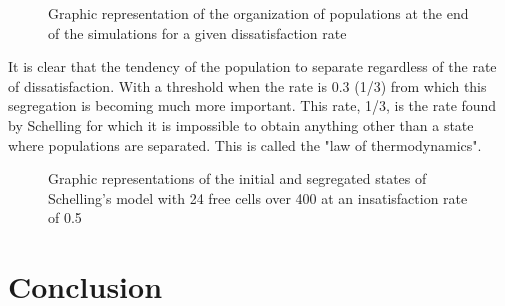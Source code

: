 \documentclass[a4paper, 12pt]{report}
\begin{document}
\begin{figure}[!h]
	\centering
	\caption{Graphic representation of the organization of populations at the end of the simulations for a given dissatisfaction rate}
\end{figure}

\newpage

It is clear that the tendency of the population to separate regardless of the rate of dissatisfaction. With a threshold when the rate is 0.3 (1/3) from which this
segregation is becoming much more important. This rate, 1/3, is the rate found by Schelling for which it is impossible to obtain anything other than a state where
populations are separated. This is called the "law of thermodynamics".

\begin{figure}[!h]
	\centering
	\caption{Graphic representations of the initial and segregated states of Schelling's model with 24 free cells over 400 at an insatisfaction rate of 0.5}
\end{figure}

\section{Conclusion}
\end{document}
